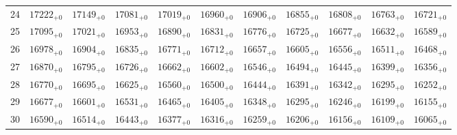 \documentclass[10pt, a4paper]{article}
\begin{document}
\begin{center}
\begin{tabular}{c || c c c c c | c c c c c}
        24 & \({17222}_{+0}\) & \({17149}_{+0}\) & \({17081}_{+0}\) & \({17019}_{+0}\) & \({16960}_{+0}\) & \({16906}_{+0}\) & \({16855}_{+0}\) & \({16808}_{+0}\) & \({16763}_{+0}\) & \({16721}_{+0}\)\\
        25 & \({17095}_{+0}\) & \({17021}_{+0}\) & \({16953}_{+0}\) & \({16890}_{+0}\) & \({16831}_{+0}\) & \({16776}_{+0}\) & \({16725}_{+0}\) & \({16677}_{+0}\) & \({16632}_{+0}\) & \({16589}_{+0}\)\\
        \hline
        26 & \({16978}_{+0}\) & \({16904}_{+0}\) & \({16835}_{+0}\) & \({16771}_{+0}\) & \({16712}_{+0}\) & \({16657}_{+0}\) & \({16605}_{+0}\) & \({16556}_{+0}\) & \({16511}_{+0}\) & \({16468}_{+0}\)\\
        27 & \({16870}_{+0}\) & \({16795}_{+0}\) & \({16726}_{+0}\) & \({16662}_{+0}\) & \({16602}_{+0}\) & \({16546}_{+0}\) & \({16494}_{+0}\) & \({16445}_{+0}\) & \({16399}_{+0}\) & \({16356}_{+0}\)\\
        28 & \({16770}_{+0}\) & \({16695}_{+0}\) & \({16625}_{+0}\) & \({16560}_{+0}\) & \({16500}_{+0}\) & \({16444}_{+0}\) & \({16391}_{+0}\) & \({16342}_{+0}\) & \({16295}_{+0}\) & \({16252}_{+0}\)\\
        29 & \({16677}_{+0}\) & \({16601}_{+0}\) & \({16531}_{+0}\) & \({16465}_{+0}\) & \({16405}_{+0}\) & \({16348}_{+0}\) & \({16295}_{+0}\) & \({16246}_{+0}\) & \({16199}_{+0}\) & \({16155}_{+0}\)\\
        30 & \({16590}_{+0}\) & \({16514}_{+0}\) & \({16443}_{+0}\) & \({16377}_{+0}\) & \({16316}_{+0}\) & \({16259}_{+0}\) & \({16206}_{+0}\) & \({16156}_{+0}\) & \({16109}_{+0}\) & \({16065}_{+0}\)\\
        \hline
    \end{tabular}
\end{center}
\pagebreak
\end{document}
